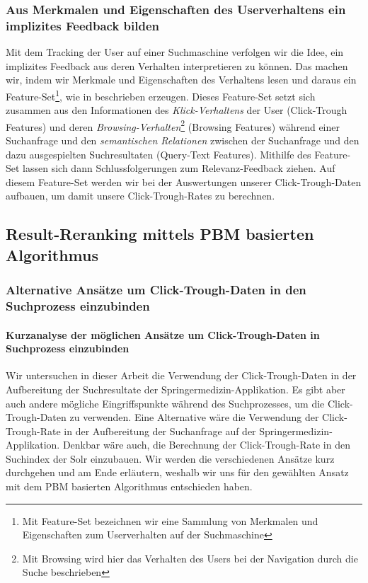\subsubsection{Aus Merkmalen und Eigenschaften des Userverhaltens ein implizites Feedback bilden}
\label{sec:Grundlagen:Grundbegriffe:Click-Trough-Daten:UserverhaltensFeedback}

Mit dem Tracking der User auf einer Suchmaschine verfolgen wir die Idee, ein implizites Feedback aus deren Verhalten interpretieren zu können. Das machen wir, indem wir Merkmale und Eigenschaften des Verhaltens lesen und daraus ein Feature-Set\footnote{Mit Feature-Set bezeichnen wir eine Sammlung von Merkmalen und Eigenschaften zum Userverhalten auf der Suchmaschine}, wie in \cite{IWUSBI} beschrieben erzeugen. Dieses Feature-Set setzt sich zusammen aus den Informationen des \textit{Klick-Verhaltens} der User (Click-Trough Features) und deren \textit{Browsing-Verhalten}\footnote{Mit Browsing wird hier das Verhalten des Users bei der Navigation durch die Suche beschrieben} (Browsing Features) während einer Suchanfrage und den \textit{semantischen Relationen} zwischen der Suchanfrage und den dazu ausgespielten Suchresultaten (Query-Text Features). Mithilfe des Feature-Set lassen sich dann  Schlussfolgerungen zum Relevanz-Feedback ziehen. Auf diesem Feature-Set werden wir bei der Auswertungen unserer Click-Trough-Daten aufbauen, um damit unsere Click-Trough-Rates zu berechnen.


\subsection{Result-Reranking mittels PBM basierten Algorithmus}
\label{sec:Grundlagen:Grundbegriffe:Result-RerankingPBM}

\subsubsection{Alternative Ansätze um Click-Trough-Daten in den Suchprozess einzubinden}
\label{sec:Grundlagen:Grundbegriffe:Result-RerankingPBM:AlternativenSucheEinbinden}

\paragraph{Kurzanalyse der möglichen Ansätze um Click-Trough-Daten in Suchprozess einzubinden} 
Wir untersuchen in dieser Arbeit die Verwendung der Click-Trough-Daten in der Aufbereitung der Suchresultate der Springermedizin-Applikation. Es gibt aber auch andere mögliche Eingriffspunkte während des Suchprozesses, um die Click-Trough-Daten zu verwenden. Eine Alternative wäre die Verwendung der Click-Trough-Rate in der Aufbereitung der Suchanfrage auf der Springermedizin-Applikation. Denkbar wäre auch, die Berechnung der Click-Trough-Rate in den Suchindex der Solr einzubauen. Wir werden die verschiedenen Ansätze kurz durchgehen und am Ende erläutern, weshalb wir uns für den gewählten Ansatz mit dem PBM basierten Algorithmus entschieden haben.

